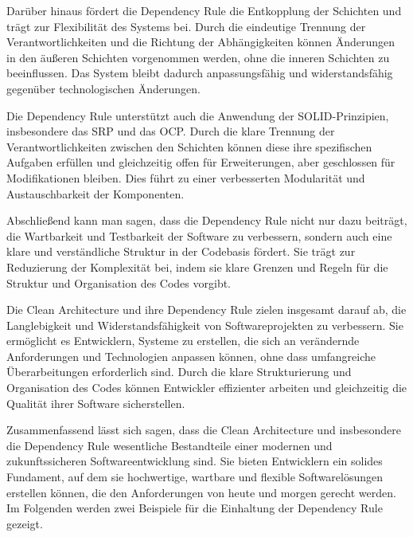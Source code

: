 Darüber hinaus fördert die Dependency Rule die Entkopplung der Schichten und trägt zur Flexibilität des Systems bei. Durch die eindeutige Trennung der Verantwortlichkeiten und die Richtung der Abhängigkeiten können Änderungen in den äußeren Schichten vorgenommen werden, ohne die inneren Schichten zu beeinflussen. Das System bleibt dadurch anpassungsfähig und widerstandsfähig gegenüber technologischen Änderungen.

Die Dependency Rule unterstützt auch die Anwendung der SOLID-Prinzipien, insbesondere das \acf{SRP} und das \acf{OCP}. Durch die klare Trennung der Verantwortlichkeiten zwischen den Schichten können diese ihre spezifischen Aufgaben erfüllen und gleichzeitig offen für Erweiterungen, aber geschlossen für Modifikationen bleiben. Dies führt zu einer verbesserten Modularität und Austauschbarkeit der Komponenten.

Abschließend kann man sagen, dass die Dependency Rule nicht nur dazu beiträgt, die Wartbarkeit und Testbarkeit der Software zu verbessern, sondern auch eine klare und verständliche Struktur in der Codebasis fördert. Sie trägt zur Reduzierung der Komplexität bei, indem sie klare Grenzen und Regeln für die Struktur und Organisation des Codes vorgibt.

Die Clean Architecture und ihre Dependency Rule zielen insgesamt darauf ab, die Langlebigkeit und Widerstandsfähigkeit von Softwareprojekten zu verbessern. Sie ermöglicht es Entwicklern, Systeme zu erstellen, die sich an verändernde Anforderungen und Technologien anpassen können, ohne dass umfangreiche Überarbeitungen erforderlich sind. Durch die klare Strukturierung und Organisation des Codes können Entwickler effizienter arbeiten und gleichzeitig die Qualität ihrer Software sicherstellen.

Zusammenfassend lässt sich sagen, dass die Clean Architecture und insbesondere die Dependency Rule wesentliche Bestandteile einer modernen und zukunftssicheren Softwareentwicklung sind. Sie bieten Entwicklern ein solides Fundament, auf dem sie hochwertige, wartbare und flexible Softwarelösungen erstellen können, die den Anforderungen von heute und morgen gerecht werden.\\

Im Folgenden werden zwei Beispiele für die Einhaltung der Dependency Rule gezeigt.
